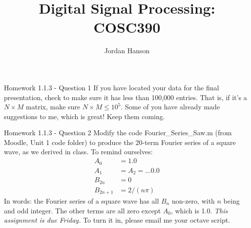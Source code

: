 \documentclass{beamer}
\title{Digital Signal Processing: COSC390}
\author{Jordan Hanson}
\institute{Whittier College Department of Physics and Astronomy}
\begin{document}
\maketitle

\begin{frame}{Homework 1.1.3 - Question 1}
If you have located your data for the final presentation, check to make sure it has less than 100,000 entries.  That is, if it's a $N\times M$ matrix, make sure $N\times M \leq 10^5$.  Some of you have already made suggestions to me, which is great!  Keep them coming.
\end{frame}

\begin{frame}{Homework 1.1.3 - Question 2}
Modify the code Fourier\_Series\_Saw.m (from Moodle, Unit 1 code folder) to produce the 20-term Fourier series of a square wave, as we derived in class.  To remind ourselves:
\begin{align}
A_0 &= 1.0 \\
A_1 &= A_2 = ... 0.0 \\
B_{2n} &= 0 \\
B_{2n+1} &= 2/(n\pi)
\end{align}
In words: the Fourier series of a square wave has all $B_n$ non-zero, with $n$ being and odd integer.  The other terms are all zero except $A_0$, which is 1.0.  \textit{This assignment is due Friday.}  To turn it in, please email me your octave script.
\end{frame}
\end{document}
